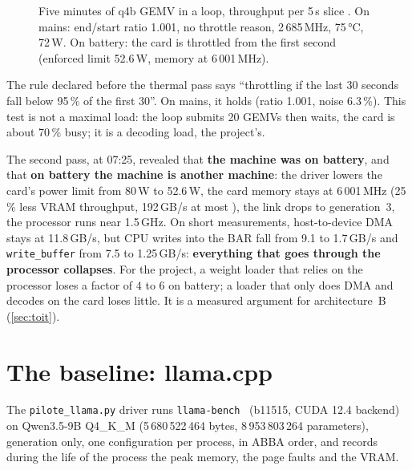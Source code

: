 \begin{figure}[ht]
\centering
\GrapheThermique
\caption[Five minutes of GEMV, mains versus battery]{Five minutes of q4b GEMV in a loop, throughput per 5\,s slice \mes. On mains: end/start ratio 1.001, no throttle reason, 2\,685\,MHz, 75\,°C, 72\,W. On battery: the card is throttled from the first second (enforced limit 52.6\,W, memory at 6\,001\,MHz).}
\label{fig:thermique}
\end{figure}

The rule declared before the thermal pass says \enquote{throttling if the last 30 seconds fall below 95\,\% of the first 30}. On mains, it holds (ratio 1.001, noise 6.3\,\%). This test is not a maximal load: the loop submits 20 GEMVs then waits, the card is about 70\,\% busy; it is a decoding load, the project's.

The second pass, at 07:25, revealed that \textbf{the machine was on battery}, and that \textbf{on battery the machine is another machine}: the driver lowers the card's power limit from 80\,W to 52.6\,W, the card memory stays at 6\,001\,MHz (25\,\% less VRAM throughput, 192\,GB/s at most \calc), the link drops to generation~3, the processor runs near 1.5\,GHz. On short measurements, host-to-device DMA stays at 11.8\,GB/s, but CPU writes into the BAR fall from 9.1 to 1.7\,GB/s and \texttt{write\_buffer} from 7.5 to 1.25\,GB/s: \textbf{everything that goes through the processor collapses}. For the project, a weight loader that relies on the processor loses a factor of 4 to 6 on battery; a loader that only does DMA and decodes on the card loses little. It is a measured argument for architecture~B (\cref{sec:toit}).

\section{The baseline: llama.cpp}\label{sec:llamacpp}

The \texttt{pilote\_llama.py} driver runs \texttt{llama-bench}~\cite{ggml2026llamacpp} (b11515, CUDA 12.4 backend) on Qwen3.5-9B Q4\_K\_M (5\,680\,522\,464 bytes, 8\,953\,803\,264 parameters), generation only, one configuration per process, in ABBA order, and records during the life of the process the peak memory, the page faults and the VRAM.


